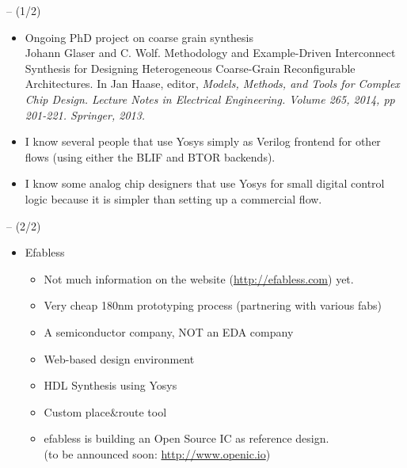 \begin{frame}{\subsecname{} -- (1/2)}
\begin{itemize}
\item Ongoing PhD project on coarse grain synthesis \\
{\setlength{\parindent}{0.5cm}\footnotesize
Johann Glaser and C. Wolf. Methodology and Example-Driven Interconnect
Synthesis for Designing Heterogeneous Coarse-Grain Reconfigurable
Architectures. In Jan Haase, editor, \it Models, Methods, and Tools for Complex
Chip Design. Lecture Notes in Electrical Engineering. Volume 265, 2014, pp
201-221. Springer, 2013.}

\bigskip
\item I know several people that use Yosys simply as Verilog frontend for other
flows (using either the BLIF and BTOR backends).

\bigskip
\item I know some analog chip designers that use Yosys for small digital
control logic because it is simpler than setting up a commercial flow.
\end{itemize}
\end{frame}

\begin{frame}{\subsecname{} -- (2/2)}
\begin{itemize}
\item Efabless
\begin{itemize}
\smallskip \item Not much information on the website (\url{http://efabless.com}) yet.
\smallskip \item Very cheap 180nm prototyping process (partnering with various fabs)
\smallskip \item A semiconductor company, NOT an EDA company
\smallskip \item Web-based design environment
\smallskip \item HDL Synthesis using Yosys
\smallskip \item Custom place\&route tool

\bigskip
\item efabless is building an Open Source IC as reference design. \\
\hskip1cm (to be announced soon: \url{http://www.openic.io})
\end{itemize}
\end{itemize}
\end{frame}


